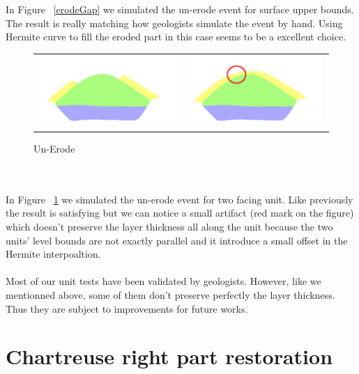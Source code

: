 \documentclass[12pt, a4paper]{report} %
\begin{document}
In Figure ~\ref{erodeGap} we simulated the un-erode event for surface upper bounds. The result is really matching how geologists simulate the event by hand. Using Hermite curve to fill the eroded part in this case seems to be a excellent choice.
\begin{figure}[htb]
\centering
\begin{tabular}{@{}cc@{}}
\includegraphics[width=.49\textwidth]{unErodeUnits0.png}&
\includegraphics[width=.49\textwidth]{unErodeUnits1.png}\\
\end{tabular}
\caption{Un-Erode}
\label{erodeUnits}
\end{figure}\\\\
In Figure ~\ref{erodeUnits} we simulated the un-erode event for two facing unit. Like previously the result is satisfying but we can notice a small artifact (red mark on the figure) which doesn't preserve the layer thickness all along the unit because the two units' level bounds are not exactly parallel and it introduce a small offset in the Hermite interpoaltion. \\\\
Most of our unit tests have been validated by geologists. However, like we mentionned above, some of them don't preserve perfectly the layer thickness. Thus they are subject to improvements for future works.
\section{Chartreuse right part restoration}
\end{document}
